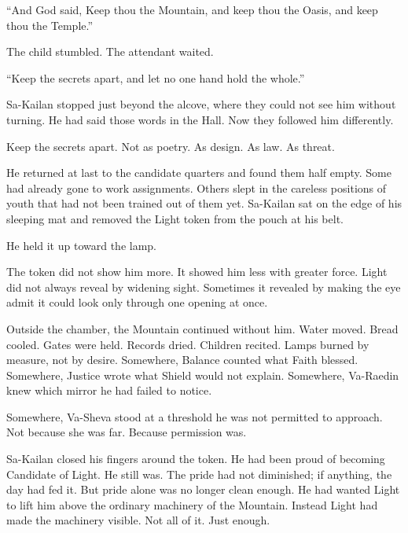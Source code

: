 \begin{scripture}
“And God said, Keep thou the Mountain, and keep thou the Oasis, and keep thou the Temple.”
\end{scripture}

The child stumbled.
The attendant waited.\par

\begin{scripture}
“Keep the secrets apart, and let no one hand hold the whole.”
\end{scripture}

Sa-Kailan stopped just beyond the alcove, where they could not see him without turning.
He had said those words in the Hall.
Now they followed him differently.\par

Keep the secrets apart.
Not as poetry.
As design.
As law.
As threat.\par

He returned at last to the candidate quarters and found them half empty.
Some had already gone to work assignments.
Others slept in the careless positions of youth that had not been trained out of them yet.
Sa-Kailan sat on the edge of his sleeping mat and removed the Light token from the pouch at his belt.\par

He held it up toward the lamp.\par

The token did not show him more.
It showed him less with greater force.
Light did not always reveal by widening sight.
Sometimes it revealed by making the eye admit it could look only through one opening at once.\par

Outside the chamber, the Mountain continued without him.
Water moved.
Bread cooled.
Gates were held.
Records dried.
Children recited.
Lamps burned by measure, not by desire.
Somewhere, Balance counted what Faith blessed.
Somewhere, Justice wrote what Shield would not explain.
Somewhere, Va-Raedin knew which mirror he had failed to notice.\par

Somewhere, Va-Sheva stood at a threshold he was not permitted to approach.
Not because she was far.
Because permission was.\par

Sa-Kailan closed his fingers around the token.
He had been proud of becoming Candidate of Light.
He still was.
The pride had not diminished; if anything, the day had fed it.
But pride alone was no longer clean enough.
He had wanted Light to lift him above the ordinary machinery of the Mountain.
Instead Light had made the machinery visible.
Not all of it.
Just enough.\par

